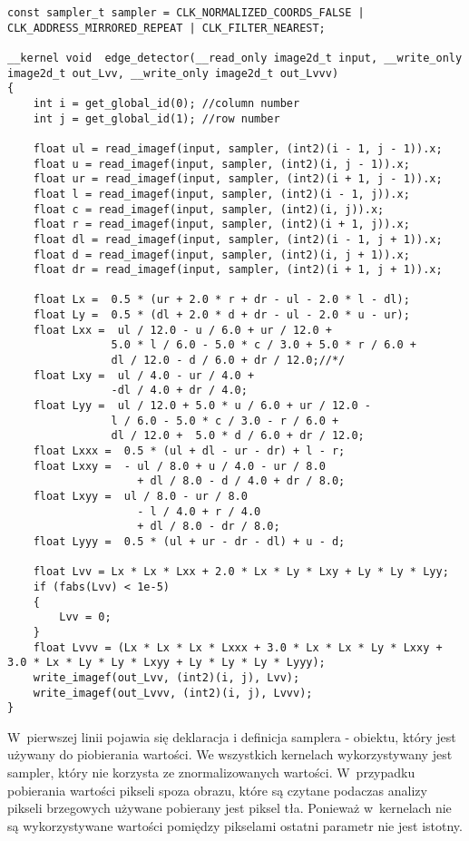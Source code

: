 \begin{lstlisting}
const sampler_t sampler = CLK_NORMALIZED_COORDS_FALSE | CLK_ADDRESS_MIRRORED_REPEAT | CLK_FILTER_NEAREST;

__kernel void  edge_detector(__read_only image2d_t input, __write_only image2d_t out_Lvv, __write_only image2d_t out_Lvvv)
{
	int i = get_global_id(0); //column number
	int j = get_global_id(1); //row number

	float ul = read_imagef(input, sampler, (int2)(i - 1, j - 1)).x;
	float u = read_imagef(input, sampler, (int2)(i, j - 1)).x;
	float ur = read_imagef(input, sampler, (int2)(i + 1, j - 1)).x;
	float l = read_imagef(input, sampler, (int2)(i - 1, j)).x;
	float c = read_imagef(input, sampler, (int2)(i, j)).x;
	float r = read_imagef(input, sampler, (int2)(i + 1, j)).x;
	float dl = read_imagef(input, sampler, (int2)(i - 1, j + 1)).x;
	float d = read_imagef(input, sampler, (int2)(i, j + 1)).x;
	float dr = read_imagef(input, sampler, (int2)(i + 1, j + 1)).x;

	float Lx =  0.5 * (ur + 2.0 * r + dr - ul - 2.0 * l - dl);
	float Ly =  0.5 * (dl + 2.0 * d + dr - ul - 2.0 * u - ur);
	float Lxx =  ul / 12.0 - u / 6.0 + ur / 12.0 +
                5.0 * l / 6.0 - 5.0 * c / 3.0 + 5.0 * r / 6.0 +
				dl / 12.0 - d / 6.0 + dr / 12.0;//*/
	float Lxy =  ul / 4.0 - ur / 4.0 +
				-dl / 4.0 + dr / 4.0;
	float Lyy =  ul / 12.0 + 5.0 * u / 6.0 + ur / 12.0 -
                l / 6.0 - 5.0 * c / 3.0 - r / 6.0 +
				dl / 12.0 +  5.0 * d / 6.0 + dr / 12.0;
	float Lxxx =  0.5 * (ul + dl - ur - dr) + l - r;
	float Lxxy =  - ul / 8.0 + u / 4.0 - ur / 8.0
					+ dl / 8.0 - d / 4.0 + dr / 8.0;
	float Lxyy =  ul / 8.0 - ur / 8.0
					- l / 4.0 + r / 4.0
					+ dl / 8.0 - dr / 8.0;
	float Lyyy =  0.5 * (ul + ur - dr - dl) + u - d;
	
	float Lvv = Lx * Lx * Lxx + 2.0 * Lx * Ly * Lxy + Ly * Ly * Lyy;
	if (fabs(Lvv) < 1e-5)
	{
		Lvv = 0;
	}
	float Lvvv = (Lx * Lx * Lx * Lxxx + 3.0 * Lx * Lx * Ly * Lxxy + 3.0 * Lx * Ly * Ly * Lxyy + Ly * Ly * Ly * Lyyy);
	write_imagef(out_Lvv, (int2)(i, j), Lvv);
	write_imagef(out_Lvvv, (int2)(i, j), Lvvv);
}
\end{lstlisting}

W~pierwszej linii pojawia się deklaracja i definicja samplera - obiektu, który jest używany do piobierania wartości. We wszystkich kernelach wykorzystywany jest sampler, który nie korzysta ze znormalizowanych wartości. W~przypadku pobierania wartości pikseli spoza obrazu, które są czytane podaczas analizy pikseli brzegowych używane pobierany jest piksel tła. Ponieważ w~kernelach nie są wykorzystywane wartości pomiędzy pikselami ostatni parametr nie jest istotny.

